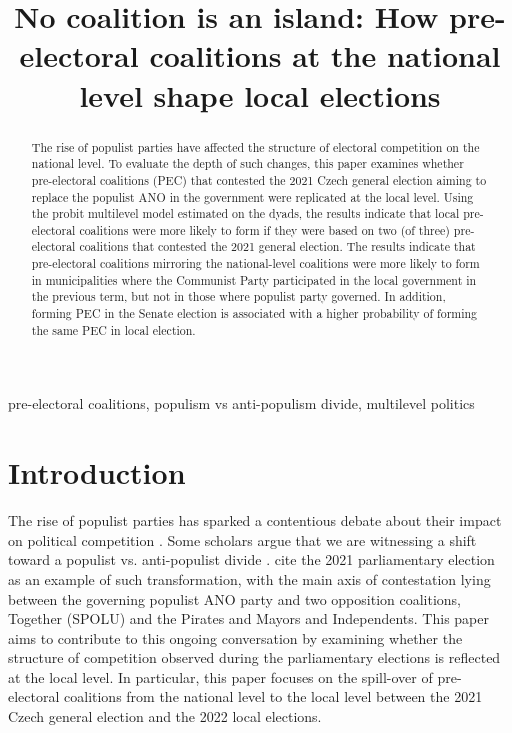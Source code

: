 \documentclass[]{interact}
\theoremstyle{plain}%
\theoremstyle{definition}
\theoremstyle{remark}
\begin{document}
\title{No coalition is an island: How pre-electoral coalitions at the national level shape local elections}

\author{
}

\maketitle

\begin{abstract}
The rise of populist parties have affected the structure of electoral competition on the national level. To evaluate the depth of such changes, this paper examines whether pre-electoral coalitions (PEC) that contested the 2021 Czech general election aiming to replace the populist ANO in the government were replicated at the local level. 
Using the probit multilevel model estimated on the dyads, the results indicate that local pre-electoral coalitions were more likely to form if they were based on two (of three) pre-electoral coalitions that contested the 2021 general election. The results indicate that pre-electoral coalitions mirroring the national-level coalitions were more likely to form in municipalities where the Communist Party participated in the local government in the previous term, but not in those where populist party governed. In addition, forming PEC in the Senate election is associated with a higher probability of forming the same PEC in local election.
\end{abstract}

\begin{keywords}
pre-electoral coalitions, populism vs anti-populism divide, multilevel politics
\end{keywords}


\section{Introduction}

The rise of populist parties has sparked a contentious debate about their impact on political competition \citep[e.g.][]{vachudova2021,moffitt2018}. Some scholars argue that we are witnessing a shift toward a populist vs. anti-populist divide \citep{moffitt2018}. \citet{havlik2022} cite the 2021 parliamentary election as an example of such transformation, with the main axis of contestation lying between the governing populist ANO party and two opposition coalitions, Together (SPOLU) and the Pirates and Mayors and Independents. This paper aims to contribute to this ongoing conversation by examining whether the structure of competition observed during the parliamentary elections is reflected at the local level. In particular, this paper focuses on the spill-over of pre-electoral coalitions from the national level to the local level between the 2021 Czech general election and the 2022 local elections. 
\end{document}
